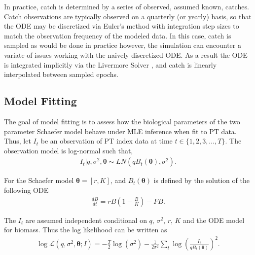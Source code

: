 \documentclass[12pt]{article}
\begin{document}
{%
In practice, catch is determined by a series of observed, assumed known, catches. 
Catch observations are typically observed on a quarterly (or yearly) basis, so 
that the ODE may be discretized via Euler’s method with integration step sizes 
to match the observation frequency of the modeled data. In this case, catch is sampled 
as would be done in practice however, the simulation can encounter a variate of issues 
working with the naively discretized ODE. As a result the ODE is integrated implicitly 
via the Livermore Solver , and catch 
is linearly interpolated between sampled epochs. 


%
\clearpage
\subsection{Model Fitting\label{modelFit}}

%
The goal of model fitting is to assess how the biological parameters of the 
two parameter Schaefer model behave under MLE inference when fit to PT data. 
Thus, let $I_t$ be an observation of PT index data at time $t\in\{1,2, 3,..., T\}$. The observation 
model is log-normal such that,
%
\begin{align}
I_t| q, \sigma^2, \bm{\theta} \sim LN(qB_t(\bm{\theta}), \sigma^2).
\end{align}

For the Schaefer model $\bm{\theta}=[r, K]$, and $B_t(\bm{\theta})$ is defined 
by the solution of the following ODE
%
\begin{align}
\frac{dB}{dt} = r B \left(1-\frac{B}{K}\right) - FB. \label{odeS}
\end{align}

The $I_t$ are assumed independent conditional on $q$, $\sigma^2$, $r$, $K$ 
and the ODE model for biomass. Thus the log likelihood can be written as 
%
\begin{align}
\log\mathcal{L}(q, \sigma^2, \bm{\theta}; I) = - \frac{T}{2}\log(\sigma^2) - \frac{1}{2\sigma^2}\sum_t \log\left(\frac{I_t}{qB_t(\bm{\theta})}\right)^2. \label{logLike}
\end{align}

}
\end{document}
